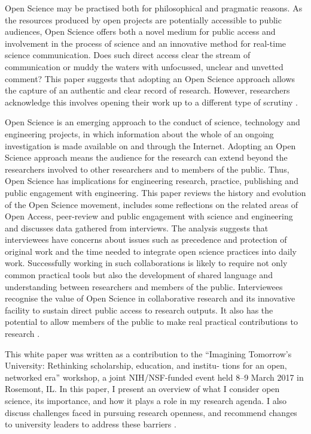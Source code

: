 Open Science may be practised both
for philosophical and pragmatic reasons. As the
resources produced by open projects are
potentially accessible to public audiences, Open
Science offers both a novel medium for public
access and involvement in the process of science
and an innovative method for real-time science
communication. Does such direct access clear
the stream of communication or muddy the
waters with unfocussed, unclear and unvetted
comment? This paper suggests that adopting an
Open Science approach allows the capture of an
authentic and clear record of research.
However, researchers acknowledge this involves
opening their work up to a different type of
scrutiny \cite{Grand2010}.

Open Science is an emerging approach to the conduct of science, technology and engineering
projects, in which information about the whole of an ongoing investigation is made available
on and through the Internet. Adopting an Open Science approach means the audience for the
research can extend beyond the researchers involved to other researchers and to members of
the public. Thus, Open Science has implications for engineering research, practice,
publishing and public engagement with engineering. This paper reviews the history and
evolution of the Open Science movement, includes some reflections on the related areas of
Open Access, peer-review and public engagement with science and engineering and discusses
data gathered from interviews. The analysis suggests that interviewees have concerns about
issues such as precedence and protection of original work and the time needed to integrate
open science practices into daily work. Successfully working in such collaborations is likely
to require not only common practical tools but also the development of shared language and
understanding between researchers and members of the public. Interviewees recognise the
value of Open Science in collaborative research and its innovative facility to sustain direct
public access to research outputs. It also has the potential to allow members of the public to
make real practical contributions to research \cite{Grand2010Open}.

This white paper was written as a contribution to the “Imagining
Tomorrow’s University: Rethinking scholarship, education, and institu-
tions for an open, networked era” workshop, a joint NIH/NSF-funded
event held 8–9 March 2017 in Rosemont, IL. In this paper, I present an
overview of what I consider open science, its importance, and how it
plays a role in my research agenda. I also discuss challenges faced in
pursuing research openness, and recommend changes to university
leaders to address these barriers \cite{niemeyer2017open}.

